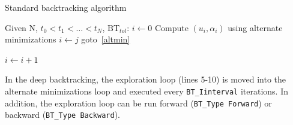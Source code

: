 \documentclass[10pt,oneside]{memoir}
\begin{document}
\begin{algorithm}
	\caption{Standard backtracking algorithm}
	\label{algo:StdBT}
		\begin{algorithmic}[1]
			\State Given N, $t_0 < t_1 < \dots < t_N$, $\mathrm{BT}_{tol}$:
			\State $i \leftarrow 0$
			\Repeat
				\State Compute $(u_i,\alpha_i)$ using alternate minimizations\label{altmin}
						\State $i \leftarrow j$
						\State goto~\ref{altmin}
					\EndIf	
				\EndFor
				
			\State $i \leftarrow i+1$
		\end{algorithmic}
\end{algorithm}

In the deep backtracking, the exploration loop (lines 5-10) is moved into the alternate minimizations loop and executed every \verb+BT_Iinterval+ iterations. In addition, the exploration loop can be run forward (\verb+BT_Type Forward+) or backward (\verb+BT_Type Backward+).
\end{document}
